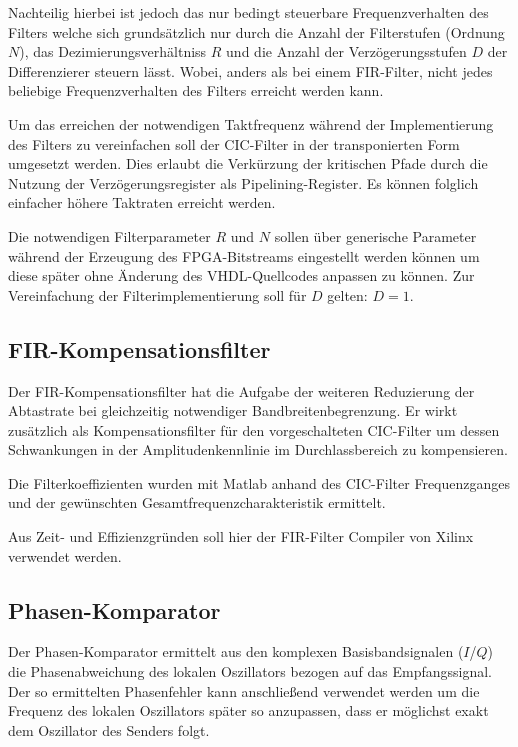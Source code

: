 Nachteilig hierbei ist jedoch das nur bedingt steuerbare Frequenzverhalten des Filters welche sich grundsätzlich nur durch die Anzahl der Filterstufen (Ordnung $N$), 
das Dezimierungsverhältniss $R$ und die Anzahl der Verzögerungsstufen $D$ der Differenzierer steuern lässt. Wobei, anders als bei einem \acs{FIR}-Filter, nicht jedes beliebige
Frequenzverhalten des Filters erreicht werden kann.\cite{DSPREL_CIC}

Um das erreichen der notwendigen Taktfrequenz während der Implementierung des Filters zu vereinfachen soll der CIC-Filter in der transponierten Form umgesetzt werden.
Dies erlaubt die Verkürzung der kritischen Pfade durch die Nutzung der Verzögerungsregister als Pipelining-Register. Es können folglich einfacher höhere Taktraten erreicht werden.

Die notwendigen Filterparameter $R$ und $N$ sollen über generische Parameter während der Erzeugung des \acs{FPGA}-Bitstreams eingestellt werden können 
um diese später ohne Änderung des \acs{VHDL}-Quellcodes anpassen zu können. Zur Vereinfachung der Filterimplementierung soll für $D$ gelten: $D=1$.

\subsection{\acs{FIR}-Kompensationsfilter}
Der \acs{FIR}-Kompensationsfilter hat die Aufgabe der weiteren Reduzierung der Abtastrate bei gleichzeitig notwendiger Bandbreitenbegrenzung. 
Er wirkt zusätzlich als Kompensationsfilter für den vorgeschalteten \acs{CIC}-Filter um dessen Schwankungen in der Amplitudenkennlinie im Durchlassbereich zu kompensieren.

Die Filterkoeffizienten wurden mit Matlab anhand des \acs{CIC}-Filter Frequenzganges und der gewünschten Gesamtfrequenzcharakteristik ermittelt.

Aus Zeit- und Effizienzgründen soll hier der \acs{FIR}-Filter Compiler\cite{XLX_FIR} von Xilinx verwendet werden.

\subsection{Phasen-Komparator} \label{Sec:PD}
Der Phasen-Komparator ermittelt aus den komplexen Basisbandsignalen ($I$/$Q$) die Phasenabweichung des lokalen Oszillators bezogen auf das Empfangssignal.
Der so ermittelten Phasenfehler kann anschließend verwendet werden um die Frequenz des lokalen Oszillators später so anzupassen, dass er möglichst exakt dem Oszillator des Senders folgt.

